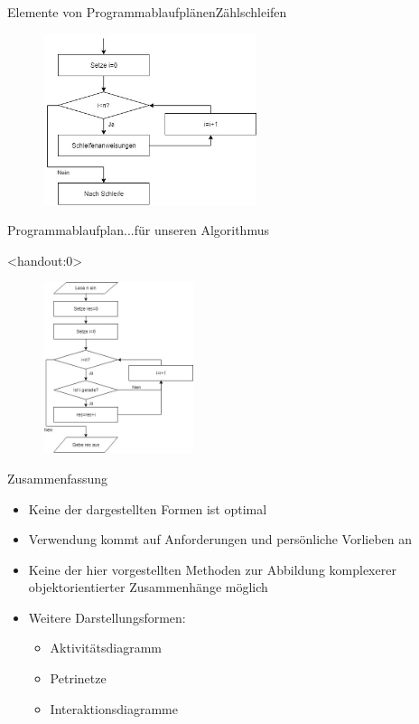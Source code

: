 \begin{frame}{Elemente von Programmablaufplänen}{Zählschleifen}
\begin{figure}
    \includegraphics[height=5cm]{graph/pap_forloop}
\end{figure}
\end{frame}

\begin{frame}{Programmablaufplan}{...für unseren Algorithmus}
\begin{onlyenv}<handout:0>
\begin{figure}
    \includegraphics[height=5cm]{graph/pap_sumeven}
\end{figure}
\end{onlyenv}
\end{frame}

\begin{frame}{Zusammenfassung}
    \begin{itemize}[<+->]
        \item Keine der dargestellten Formen ist optimal
        \item Verwendung kommt auf Anforderungen und persönliche Vorlieben an
        \item Keine der hier vorgestellten Methoden zur Abbildung komplexerer objektorientierter Zusammenhänge möglich
        \item Weitere Darstellungsformen:
        \begin{itemize}
            \item Aktivitätsdiagramm
            \item Petrinetze
            \item Interaktionsdiagramme
        \end{itemize}
    \end{itemize}
\end{frame}